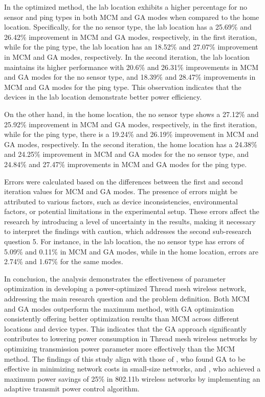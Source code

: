 In the optimized method, the lab location exhibits a higher percentage for no sensor and ping types in both \gls{MCM} and \gls{GA} modes when compared to the home location. Specifically, for the no sensor type, the lab location has a 25.69\% and 26.42\% improvement in \gls{MCM} and \gls{GA} modes, respectively, in the first iteration, while for the ping type, the lab location has an 18.52\% and 27.07\% improvement in \gls{MCM} and \gls{GA} modes, respectively. In the second iteration, the lab location maintains its higher performance with 20.6\% and 26.31\% improvements in \gls{MCM} and \gls{GA} modes for the no sensor type, and 18.39\% and 28.47\% improvements in \gls{MCM} and \gls{GA} modes for the ping type. This observation indicates that the devices in the lab location demonstrate better power efficiency.

On the other hand, in the home location, the no sensor type shows a 27.12\% and 25.92\% improvement in \gls{MCM} and \gls{GA} modes, respectively, in the first iteration, while for the ping type, there is a 19.24\% and 26.19\% improvement in \gls{MCM} and \gls{GA} modes, respectively. In the second iteration, the home location has a 24.38\% and 24.25\% improvement in \gls{MCM} and \gls{GA} modes for the no sensor type, and 24.84\% and 27.47\% improvements in \gls{MCM} and \gls{GA} modes for the ping type.

Errors were calculated based on the differences between the first and second iteration values for \gls{MCM} and \gls{GA} modes. The presence of errors might be attributed to various factors, such as device inconsistencies, environmental factors, or potential limitations in the experimental setup. These errors affect the research by introducing a level of uncertainty in the results, making it necessary to interpret the findings with caution, which addresses the second sub-research question 5. For instance, in the lab location, the no sensor type has errors of 5.09\% and 0.11\% in \gls{MCM} and \gls{GA} modes, while in the home location, errors are 2.74\% and 1.67\% for the same modes.

In conclusion, the analysis demonstrates the effectiveness of parameter optimization in developing a power-optimized Thread mesh wireless network, addressing the main research question and the problem definition. Both \gls{MCM} and \gls{GA} modes outperform the maximum method, with \gls{GA} optimization consistently offering better optimization results than \gls{MCM} across different locations and device types. This indicates that the \gls{GA} approach significantly contributes to lowering power consumption in Thread mesh wireless networks by optimizing transmission power parameter more effectively than the \gls{MCM} method. The findings of this study align with those of \textcite{girgis2014solving}, who found \gls{GA} to be effective in minimizing network costs in small-size networks, and \textcite{sheth2002implementation}, who achieved a maximum power savings of 25\% in 802.11b wireless networks by implementing an adaptive transmit power control algorithm.

